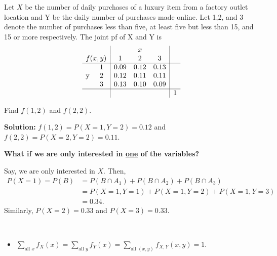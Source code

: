 \begin{example}
    Let $X$ be the number of daily purchases of a luxury item from a factory outlet location and Y be the daily number of purchases made online. Let 1,2, and 3 denote the number of purchases less than five, at least five but less than 15, and 15 or more respectively. The joint pf of X and Y is
    \[
        \begin{array}{cc|ccc|c}
            & & \multicolumn{3}{c|}{x} & \\
            \multicolumn{2}{c|}{f(x,y)} & 1 & 2 & 3 & \\
            \hline
            \multirow{3}{*}{y} 
              & 1 & 0.09 & 0.12 & 0.13 & \\
              & 2 & 0.12 & 0.11 & 0.11 & \\
              & 3 & 0.13 & 0.10 & 0.09 & \\
            \hline
            & & & & & 1
        \end{array}
    \]

    Find $f(1,2)$ and $f(2,2)$.

    \textbf{Solution:} $f(1,2) = P(X=1, Y=2) = 0.12$ and $f(2,2) = P(X=2, Y=2) = 0.11$.
\end{example}

\pagebreak

\textbf{What if we are only interested in \underline{one} of the variables?}

\begin{example}[continued]
    Say, we are only interested in $X$. Then, \vspace{-3mm}
    \begin{align*}
        P(X = 1) = P(B) &= P(B \cap A_1) + P(B \cap A_2) + P(B \cap A_3) \\
        & = P(X=1,Y=1) + P(X=1,Y=2) + P(X=1,Y=3) \\
        & = 0.34.
    \end{align*}
    Similarly, $P(X=2) = 0.33$ and $P(X = 3) = 0.33$.
\end{example}

\begin{note}
    \phantom{}\
    \begin{itemize}
        \item $\displaystyle \sum_{\text{all } x} f_X(x) = \displaystyle \sum_{\text{all } y} f_Y(x) = \displaystyle \sum_{\text{all } (x,y)} f_{X,Y}(x,y) = 1$.
    \end{itemize}
\end{note}


